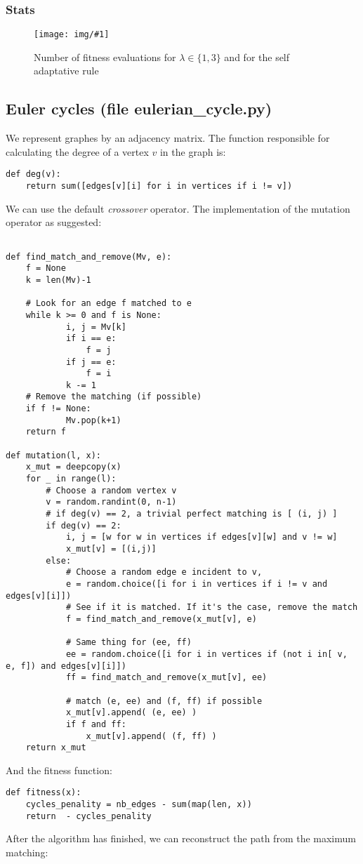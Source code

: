 \documentclass{article}
\newcommand{\IMG}[3]{
\begin{figure}[H]
\centering
\texttt{[image: img/\#1]}%
\caption{#2}%
\label{#1}%
\end{figure}

}
\newcommand{\Stats}{\subsubsection{Stats}}
\begin{document}
\Stats
\IMG{stat_matching_1.png}{Number of fitness evaluations for $\lambda \in \{1, 3\}$ and for the self adaptative rule}{0.5}


\subsection{Euler cycles (file eulerian\_cycle.py)}
We represent graphes by an adjacency matrix. The function responsible for calculating the degree of a vertex $v$ in the graph is:
\begin{verbatim}
def deg(v):
    return sum([edges[v][i] for i in vertices if i != v])
\end{verbatim}

We can use the default \textit{crossover} operator.
The implementation of the mutation operator as suggested:
\begin{verbatim}

def find_match_and_remove(Mv, e):
    f = None
    k = len(Mv)-1
    
    # Look for an edge f matched to e
    while k >= 0 and f is None:
			i, j = Mv[k]
			if i == e:
				f = j
			if j == e:
				f = i
			k -= 1
    # Remove the matching (if possible)
    if f != None:
			Mv.pop(k+1)
    return f
        
def mutation(l, x):
	x_mut = deepcopy(x)
	for _ in range(l):  
		# Choose a random vertex v
		v = random.randint(0, n-1)
		# if deg(v) == 2, a trivial perfect matching is [ (i, j) ]
		if deg(v) == 2:
			i, j = [w for w in vertices if edges[v][w] and v != w]
			x_mut[v] = [(i,j)]
		else:
			# Choose a random edge e incident to v, 
			e = random.choice([i for i in vertices if i != v and edges[v][i]])
			# See if it is matched. If it's the case, remove the match
			f = find_match_and_remove(x_mut[v], e)
			
			# Same thing for (ee, ff)
			ee = random.choice([i for i in vertices if (not i in[ v, e, f]) and edges[v][i]])
			ff = find_match_and_remove(x_mut[v], ee)
			
			# match (e, ee) and (f, ff) if possible
			x_mut[v].append( (e, ee) )
			if f and ff:
				x_mut[v].append( (f, ff) )
	return x_mut
\end{verbatim}

And the fitness function:
\begin{verbatim}
def fitness(x):
	cycles_penality = nb_edges - sum(map(len, x))  
	return  - cycles_penality
\end{verbatim}

After the algorithm has finished, we can reconstruct the path from the maximum matching:
\end{document}
